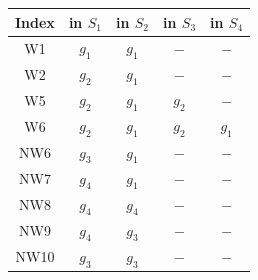 \documentclass{amsart}
\theoremstyle{definition}
\theoremstyle{remark}
\theoremstyle{Conjecture/open problem}
\theoremstyle{assumption}
\theoremstyle{conjecture}
\numberwithin{equation}{section}
\begin{document}
\begin{center}
\begin{tabular}{ |c|c|c|c|c| }
 \hline
Index  & in $S_1$ & in $S_2$ & in $S_3$& in $S_4$ \\
 \hline
W1  & $g_1$ &$g_1$& $-$& $-$  \\
            \hline
W2  & $g_2$ &$g_1$&$-$& $-$  \\
            \hline
W5  & $g_2$ &$g_1$&$g_2$& $-$  \\
            \hline    
W6  & $g_2$ &$g_1$&$g_2$& $g_1$  \\
            \hline                      

NW6  & $g_3$ &$g_1$& $-$& $-$   \\
            \hline
NW7  & $g_4$ &$g_1$& $-$& $-$   \\
            \hline
NW8  & $g_4$ &$g_4$& $-$& $-$   \\
            \hline
NW9  & $g_4$ &$g_3$& $-$& $-$   \\
            \hline    
NW10  & $g_3$ &$g_3$& $-$& $-$   \\
            \hline                      
 \end{tabular}
\end{center}
\end{document}
